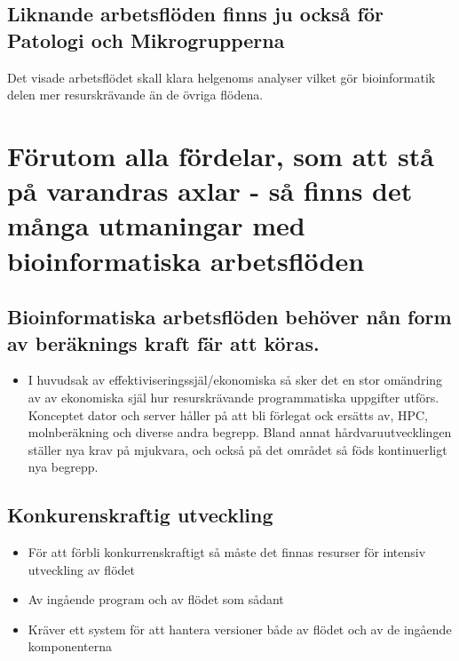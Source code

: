 \documentclass[
  letterpaper,
  DIV=11,
  numbers=noendperiod]{scrreprt}
\providecommand{\tightlist}{%
  \setlength{\itemsep}{0pt}\setlength{\parskip}{0pt}}\usepackage{longtable,booktabs,array}
\begin{document}
\section{Liknande arbetsflöden finns ju också för Patologi och
Mikrogrupperna}\label{liknande-arbetsfluxf6den-finns-ju-ocksuxe5-fuxf6r-patologi-och-mikrogrupperna}

Det visade arbetsflödet skall klara helgenoms analyser vilket gör
bioinformatik delen mer resurskrävande än de övriga flödena.

\section{}\label{section-1}


\chapter{Förutom alla fördelar, som att stå på varandras axlar - så
finns det många utmaningar med bioinformatiska
arbetsflöden}\label{fuxf6rutom-alla-fuxf6rdelar-som-att-stuxe5-puxe5-varandras-axlar---suxe5-finns-det-muxe5nga-utmaningar-med-bioinformatiska-arbetsfluxf6den}

\section{Bioinformatiska arbetsflöden behöver nån form av beräknings
kraft fär att
köras.}\label{bioinformatiska-arbetsfluxf6den-behuxf6ver-nuxe5n-form-av-beruxe4knings-kraft-fuxe4r-att-kuxf6ras.}

\begin{itemize}
\tightlist
\item
  I huvudsak av effektiviseringssjäl/ekonomiska så sker det en stor
  omändring av av ekonomiska själ hur resurskrävande programmatiska
  uppgifter utförs. Konceptet dator och server håller på att bli
  förlegat ock ersätts av, HPC, molnberäkning och diverse andra begrepp.
  Bland annat hårdvaruutvecklingen ställer nya krav på mjukvara, och
  också på det området så föds kontinuerligt nya begrepp.
\end{itemize}

\section{Konkurenskraftig utveckling}\label{konkurenskraftig-utveckling}

\begin{itemize}
\item
  För att förbli konkurrenskraftigt så måste det finnas resurser för
  intensiv utveckling av flödet
\item
  Av ingående program och av flödet som sådant
\item
  Kräver ett system för att hantera versioner både av flödet och av de
  ingående komponenterna
\end{itemize}
\end{document}
